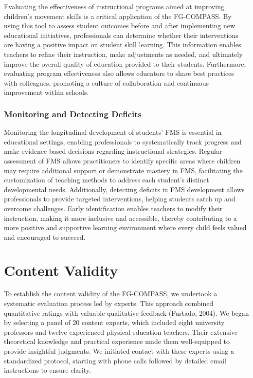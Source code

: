\documentclass[
  letterpaper,
  DIV=11,
  numbers=noendperiod]{scrreprt}
\begin{document}
Evaluating the effectiveness of instructional programs aimed at
improving children's movement skills is a critical application of the
FG-COMPASS. By using this tool to assess student outcomes before and
after implementing new educational initiatives, professionals can
determine whether their interventions are having a positive impact on
student skill learning. This information enables teachers to refine
their instruction, make adjustments as needed, and ultimately improve
the overall quality of education provided to their students.
Furthermore, evaluating program effectiveness also allows educators to
share best practices with colleagues, promoting a culture of
collaboration and continuous improvement within schools.

\subsection{Monitoring and Detecting
Deficits}\label{monitoring-and-detecting-deficits}

Monitoring the longitudinal development of students' FMS is essential in
educational settings, enabling professionals to systematically track
progress and make evidence-based decisions regarding instructional
strategies. Regular assessment of FMS allows practitioners to identify
specific areas where children may require additional support or
demonstrate mastery in FMS, facilitating the customization of teaching
methods to address each student's distinct developmental needs.
Additionally, detecting deficits in FMS development allows professionals
to provide targeted interventions, helping students catch up and
overcome challenges. Early identification enables teachers to modify
their instruction, making it more inclusive and accessible, thereby
contributing to a more positive and supportive learning environment
where every child feels valued and encouraged to succeed.


\chapter{Content Validity}\label{content-validity}

To establish the content validity of the FG-COMPASS, we undertook a
systematic evaluation process led by experts. This approach combined
quantitative ratings with valuable qualitative feedback (Furtado, 2004).
We began by selecting a panel of 20 content experts, which included
eight university professors and twelve experienced physical education
teachers. Their extensive theoretical knowledge and practical experience
made them well-equipped to provide insightful judgments. We initiated
contact with these experts using a standardized protocol, starting with
phone calls followed by detailed email instructions to ensure clarity.
\end{document}

